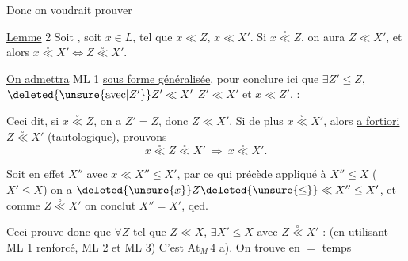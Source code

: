 
Donc on voudrait prouver

\uline{Lemme} 2 Soit
, soit $x\in L$, tel que $x\ll Z$,  $x\ll X'$. Si $x\overset{\circ}{\ll}Z$, on aura $Z\ll X'$, et alors $x\overset{\circ}{\ll}X'\Longleftrightarrow Z\overset{\circ}{\ll}X'$.

\uline{On admettra} ML 1 \uline{sous forme généralisée}, pour conclure ici que $\exists Z'\leq Z$, $\deleted{\unsure{\text{avec}|Z'}}Z'\ll X'$ $Z'\ll X'$ et $x\ll Z'$, :

Ceci dit, si $x\overset{\circ}{\ll}Z$, on a $Z'=Z$, donc $Z\ll X'$. Si de plus $x\overset{\circ}{\ll}X'$, alors \uline{a fortiori}  $Z\overset{\circ}{\ll}X'$ (tautologique), prouvons  
\[
x\overset{\circ}{\ll}Z\overset{\circ}{\ll}X'\ \Longrightarrow\ x\overset{\circ}{\ll}X'.
\]

Soit en effet  $X''$ avec $x\ll X''\leq X'$, par ce qui précède appliqué à $X''\leq X$ ( $X'\leq X$) on a $\deleted{\unsure{x}}Z\deleted{\unsure{\leq}}\ll X''\leq X'$, et comme $Z\overset{\circ}{\ll}X'$ on conclut $X''=X'$, qed.

Ceci prouve donc que $\forall Z$ \deleted{\unsure{$\in$}}tel que $Z\ll X$, $\exists X'\leq X$ avec $Z\overset{\circ}{\ll}X'$ : (en utilisant ML 1 renforcé, ML 2 et ML 3) C'est $\mathrm{At}_{M}\,4$ a). On trouve en $=$ temps
